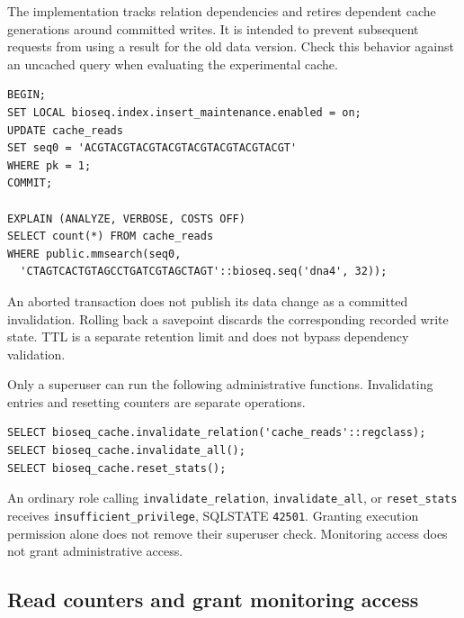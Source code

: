The implementation tracks relation dependencies and retires dependent cache
generations around committed writes. It is intended to prevent subsequent
requests from using a result for the old data version. Check this behavior
against an uncached query when evaluating the experimental cache.

\par\noindent\begin{minipage}{\linewidth}
\begin{lstlisting}[style=bioseq-appendix-sql,
  caption={Change an input row and inspect the next search.}]
BEGIN;
SET LOCAL bioseq.index.insert_maintenance.enabled = on;
UPDATE cache_reads
SET seq0 = 'ACGTACGTACGTACGTACGTACGTACGTACGT'
WHERE pk = 1;
COMMIT;

EXPLAIN (ANALYZE, VERBOSE, COSTS OFF)
SELECT count(*) FROM cache_reads
WHERE public.mmsearch(seq0,
  'CTAGTCACTGTAGCCTGATCGTAGCTAGT'::bioseq.seq('dna4', 32));
\end{lstlisting}
\end{minipage}

An aborted transaction does not publish its data change as a committed
invalidation. Rolling back a savepoint discards the corresponding recorded
write state. TTL is a separate retention limit and does not bypass dependency
validation.

Only a superuser can run the following administrative functions. Invalidating
entries and resetting counters are separate operations.

\par\noindent\begin{minipage}{\linewidth}
\begin{lstlisting}[style=bioseq-appendix-sql,
  caption={Administrative cache operations.}]
SELECT bioseq_cache.invalidate_relation('cache_reads'::regclass);
SELECT bioseq_cache.invalidate_all();
SELECT bioseq_cache.reset_stats();
\end{lstlisting}
\end{minipage}

An ordinary role calling \texttt{invalidate\_relation},
\texttt{invalidate\_all}, or \texttt{reset\_stats} receives
\texttt{insufficient\_privilege}, SQLSTATE \texttt{42501}.
Granting execution permission alone does not remove their superuser check.
Monitoring access does not grant administrative access.

\subsection{Read counters and grant monitoring access}


